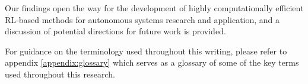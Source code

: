 Our findings open the way for the development of highly computationally efficient RL-based methods for autonomous systems research and application, and a discussion of potential directions for future work is provided.

For guidance on the terminology used throughout this writing, please refer to appendix \ref{appendix:glossary} which serves as a glossary of some of the key terms used throughout this research.
